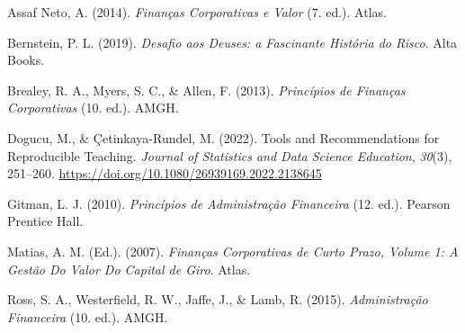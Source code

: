 \documentclass[
  a4paper,
]{book}
\newlength{\cslhangindent}
\newenvironment{CSLReferences}[2] %
 {\begin{list}{}{%
  \setlength{\itemindent}{0pt}
  \setlength{\leftmargin}{0pt}
  \setlength{\parsep}{0pt}
  \ifodd #1
   \setlength{\leftmargin}{\cslhangindent}
   \setlength{\itemindent}{-1\cslhangindent}
  \fi
  \setlength{\itemsep}{#2\baselineskip}}}
 {\end{list}}
\begin{document}
\label{refs}
\begin{CSLReferences}{1}{0}
Assaf Neto, A. (2014). \emph{Finan{ç}as Corporativas e Valor} (7. ed.).
Atlas.

Bernstein, P. L. (2019). \emph{{Desafio aos Deuses: a Fascinante
Hist{ó}ria do Risco}}. Alta Books.

Brealey, R. A., Myers, S. C., \& Allen, F. (2013). \emph{Princ{í}pios de
Finan{ç}as Corporativas} (10. ed.). AMGH.

Dogucu, M., \& Çetinkaya-Rundel, M. (2022). Tools and Recommendations
for Reproducible Teaching. \emph{Journal of Statistics and Data Science
Education}, \emph{30}(3), 251--260.
\url{https://doi.org/10.1080/26939169.2022.2138645}

Gitman, L. J. (2010). \emph{Princ{í}pios de Administra{ç}{ã}o
Financeira} (12. ed.). Pearson Prentice Hall.

Matias, A. M. (Ed.). (2007). \emph{Finan{ç}as Corporativas de Curto
Prazo, Volume 1: A Gest{ã}o Do Valor Do Capital de Giro}. Atlas.

Ross, S. A., Westerfield, R. W., Jaffe, J., \& Lamb, R. (2015).
\emph{Administra{ç}{ã}o Financeira} (10. ed.). AMGH.

\end{CSLReferences}


\backmatter
\end{document}
